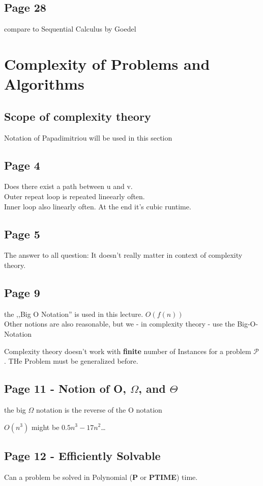 \documentclass[a4paper]{article}
\begin{document}
\subsection{Page 28}
compare to Sequential Calculus by Goedel

\section{Complexity of Problems and Algorithms}

\subsection{Scope of complexity theory}
Notation of Papadimitriou will be used in this section

\subsection{Page 4}
Does there exist a path between u and v.\\
Outer repeat loop is repeated lineearly often.\\
Inner loop also linearly often. At the end it's cubic runtime.

\subsection{Page 5}
The answer to all question: It doesn't really matter in context of complexity
theory.

\subsection{Page 9}
the ,,Big O Notation'' is used in this lecture. $O(f(n))$\\
Other notions are also reasonable, but we - in complexity theory - use the
Big-O-Notation

Complexity theory doesn't work with \textbf{finite} number of Instances for a
problem $\mathcal{P}$. THe Problem must be generalized before.

\subsection{Page 11 - Notion of O, $\Omega$, and $\Theta$}
the big $\Omega$ notation is the reverse of the O notation

$ O(n^3) $ might be $ 0.5n^3-17n^2 $\ldots


\subsection{Page 12 - Efficiently Solvable}
Can a problem be solved in Polynomial (\textbf{P} or \textbf{PTIME}) time.
\end{document}

